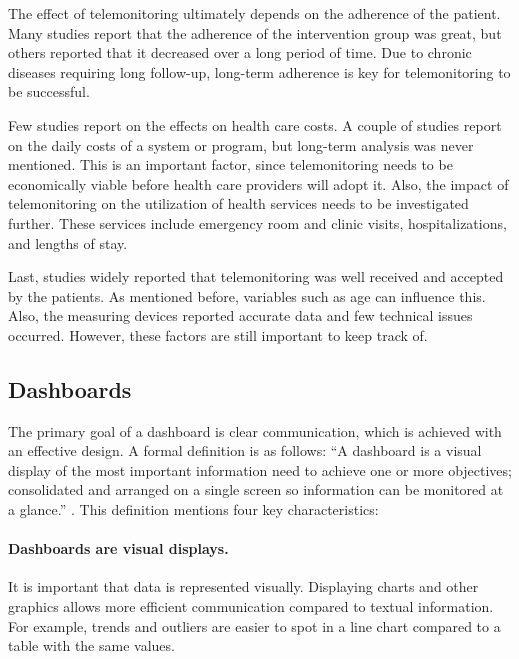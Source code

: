         The effect of telemonitoring ultimately depends on the adherence of the patient. Many studies report that the adherence of the intervention group was great, but others reported that it decreased over a long period of time. Due to chronic diseases requiring long follow-up, long-term adherence is key for telemonitoring to be successful. 

        Few studies report on the effects on health care costs. A couple of studies report on the daily costs of a system or program, but long-term analysis was never mentioned. This is an important factor, since telemonitoring needs to be economically viable before health care providers will adopt it. Also, the impact of telemonitoring on the utilization of health services needs to be investigated further. These services include emergency room and clinic visits, hospitalizations, and lengths of stay. 
        
        Last, studies widely reported that telemonitoring was well received and accepted by the patients. As mentioned before, variables such as age can influence this. Also, the measuring devices reported accurate data and few technical issues occurred. However, these factors are still important to keep track of.

    \subsection{Dashboards} \label{2_dashboards}

    The primary goal of a dashboard is clear communication, which is achieved with an effective design. A formal definition is as follows: ``A dashboard is a visual display of the most important information need to achieve one or more objectives; consolidated and arranged on a single screen so information can be monitored at a glance.'' \cite{dashboard}. This definition mentions four key characteristics:

    \paragraph{Dashboards are visual displays.} It is important that data is represented visually. Displaying charts and other graphics allows more efficient communication compared to textual information. For example, trends and outliers are easier to spot in a line chart compared to a table with the same values.

